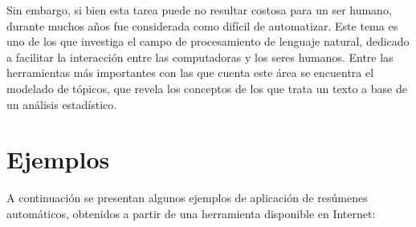 \documentclass[12pt,a4paper]{article}
\begin{document}
Sin embargo, si bien esta tarea puede no resultar costosa para un ser humano, durante muchos años fue considerada como difícil de automatizar. Este tema es uno de los que investiga el campo de procesamiento de lenguaje natural, dedicado a facilitar la interacción entre las computadoras y los seres humanos. Entre las herramientas más importantes con las que cuenta este área se encuentra el modelado de tópicos, que revela los conceptos de los que trata un texto a base de un análisis estadístico.

\section{Ejemplos}
A continuación se presentan algunos ejemplos de aplicación de resúmenes automáticos, obtenidos a partir de una herramienta disponible en Internet:\cite{tools4noobs}
\end{document}

